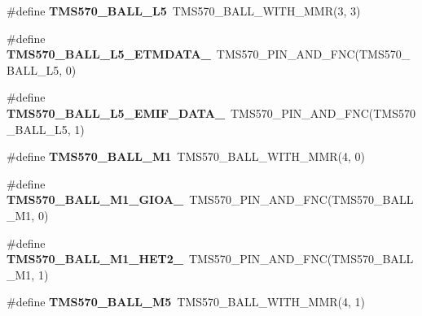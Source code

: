 \begin{DoxyCompactItemize}
\item 
\mbox{\label{tms570ls3137zwt-pins_8h_ad2eb813d5f1899f0b9c59801418514b4}} 
\#define {\bfseries T\+M\+S570\+\_\+\+B\+A\+L\+L\+\_\+\+L5}~T\+M\+S570\+\_\+\+B\+A\+L\+L\+\_\+\+W\+I\+T\+H\+\_\+\+M\+MR(3, 3)
\item 
\mbox{\label{tms570ls3137zwt-pins_8h_aefe5e167ca68d278ad7c5054918279ef}} 
\#define {\bfseries T\+M\+S570\+\_\+\+B\+A\+L\+L\+\_\+\+L5\+\_\+\+E\+T\+M\+D\+A\+T\+A\+\_}~T\+M\+S570\+\_\+\+P\+I\+N\+\_\+\+A\+N\+D\+\_\+\+F\+NC(T\+M\+S570\+\_\+\+B\+A\+L\+L\+\_\+\+L5, 0)
\item 
\mbox{\label{tms570ls3137zwt-pins_8h_ae99ea578c1bee80f5fd5a2e2533c2cc4}} 
\#define {\bfseries T\+M\+S570\+\_\+\+B\+A\+L\+L\+\_\+\+L5\+\_\+\+E\+M\+I\+F\+\_\+\+D\+A\+T\+A\+\_}~T\+M\+S570\+\_\+\+P\+I\+N\+\_\+\+A\+N\+D\+\_\+\+F\+NC(T\+M\+S570\+\_\+\+B\+A\+L\+L\+\_\+\+L5, 1)
\item 
\mbox{\label{tms570ls3137zwt-pins_8h_ab4f030496ff76318c357b877deadfc84}} 
\#define {\bfseries T\+M\+S570\+\_\+\+B\+A\+L\+L\+\_\+\+M1}~T\+M\+S570\+\_\+\+B\+A\+L\+L\+\_\+\+W\+I\+T\+H\+\_\+\+M\+MR(4, 0)
\item 
\mbox{\label{tms570ls3137zwt-pins_8h_ad735092224f60d58e4da67dbc4342f8d}} 
\#define {\bfseries T\+M\+S570\+\_\+\+B\+A\+L\+L\+\_\+\+M1\+\_\+\+G\+I\+O\+A\+\_}~T\+M\+S570\+\_\+\+P\+I\+N\+\_\+\+A\+N\+D\+\_\+\+F\+NC(T\+M\+S570\+\_\+\+B\+A\+L\+L\+\_\+\+M1, 0)
\item 
\mbox{\label{tms570ls3137zwt-pins_8h_af40ef443390335a28e18686ad19b5480}} 
\#define {\bfseries T\+M\+S570\+\_\+\+B\+A\+L\+L\+\_\+\+M1\+\_\+\+H\+E\+T2\+\_}~T\+M\+S570\+\_\+\+P\+I\+N\+\_\+\+A\+N\+D\+\_\+\+F\+NC(T\+M\+S570\+\_\+\+B\+A\+L\+L\+\_\+\+M1, 1)
\item 
\mbox{\label{tms570ls3137zwt-pins_8h_a182bcf3a635be6319644d9e5f61969c9}} 
\#define {\bfseries T\+M\+S570\+\_\+\+B\+A\+L\+L\+\_\+\+M5}~T\+M\+S570\+\_\+\+B\+A\+L\+L\+\_\+\+W\+I\+T\+H\+\_\+\+M\+MR(4, 1)
\item 
\mbox{\label{tms570ls3137zwt-pins_8h_ab4960888ff7fd88f184e5da184d4cab8}} 

\end{DoxyCompactItemize}
